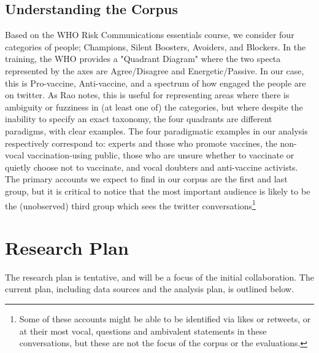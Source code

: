 \documentclass{article}
\begin{document}


\subsection{Understanding the Corpus}

Based on the WHO Risk Communications essentials course, we consider four categories of people; Champions, Silent Boosters, Avoiders, and Blockers. In the training, the WHO provides a "Quadrant Diagram" \cite{Rao2009b} where the two specta represented by the axes are Agree/Disagree and Energetic/Passive. In our case, this is Pro-vaccine, Anti-vaccine, and a spectrum of how engaged the people are on twitter. As Rao notes, this is useful for representing areas where there is ambiguity or fuzziness in (at least one of) the categories, but where despite the inability to specify an exact taxonomy, the four quadrants are different paradigms, with clear examples. The four paradigmatic examples in our analysis respectively correspond to: experts and those who promote vaccines, the non-vocal vaccination-using public, those who are unsure whether to vaccinate or quietly choose not to vaccinate, and vocal doubters and anti-vaccine activists. The primary accounts we expect to find in our corpus are the first and last group, but it is critical to notice that the most important audience is likely to be the (unobserved) third group which sees the twitter conversations\footnote{Some of these accounts might be able to be identified via likes or retweets, or at their most vocal, questions and ambivalent statements in these conversations, but these are not the focus of the corpus or the evaluations.}

\section{Research Plan}

The research plan is tentative, and will be a focus of the initial collaboration. The current plan, including data sources and the analysis plan, is outlined below.
\end{document}
